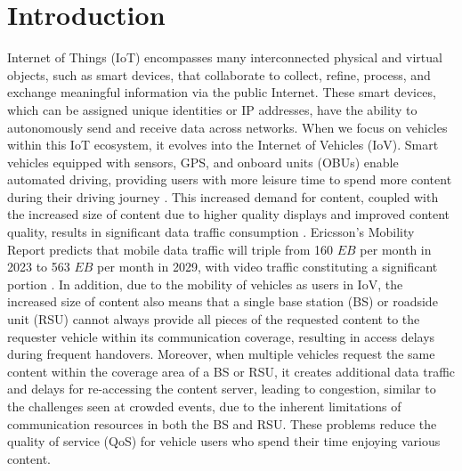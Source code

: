 \documentclass[journal]{IEEEtran}
\begin{document}
\section{Introduction}
 Internet of Things (IoT) encompasses many interconnected physical and virtual objects, such as smart devices, that collaborate to collect, refine, process, and exchange meaningful information via the public Internet.
These smart devices, which can be assigned unique identities or IP addresses, have the ability to autonomously send and receive data across networks.
When we focus on vehicles within this IoT ecosystem, it evolves into the Internet of Vehicles (IoV).
Smart vehicles equipped with sensors, GPS, and onboard units (OBUs) enable automated driving, providing users with more leisure time to spend more content during their driving journey \cite{Zhe2020, yuan2018}.
This increased demand for content, coupled with the increased size of content due to higher quality displays and improved content quality, results in significant data traffic consumption \cite{Kumer2013, Pranav2019, Reichardt2002, Yen2020}.
Ericsson's Mobility Report predicts that mobile data traffic will triple from 160 $EB$ per month in 2023 to 563 $EB$ per month in 2029, with video traffic constituting a significant portion \cite{Ericsson}.
In addition, due to the mobility of vehicles as users in IoV, the increased size of content also means that a single base station (BS) or roadside unit (RSU) cannot always provide all pieces of the requested content to the requester vehicle within its communication coverage, resulting in access delays during frequent handovers.
Moreover, when multiple vehicles request the same content within the coverage area of a BS or RSU, it creates additional data traffic and delays for re-accessing the content server, leading to congestion, similar to the challenges seen at crowded events, due to the inherent limitations of communication resources in both the BS and RSU.
These problems reduce the quality of service (QoS) for vehicle users who spend their time enjoying various content.
\end{document}
